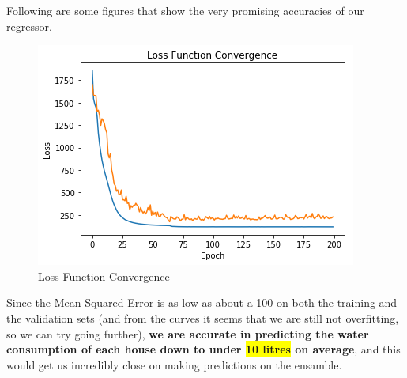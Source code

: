 \documentclass{article}
\begin{document}
Following are some figures that show the very promising accuracies of our regressor. 

\begin{figure}[H]
    \centering
    \includegraphics[width=\linewidth]{img-loss-fn-convergence.png}
    \caption{Loss Function Convergence}
    \label{fig:img-loss-fn-convergence}
\end{figure}

Since the Mean Squared Error is as low as about a 100 on both the training and the validation sets (and from the curves it seems that we are still not overfitting, so we can try going further), \textbf{we are accurate in predicting the water consumption of each house down to under \colorbox{yellow}{10 litres} on average}, and this would get us incredibly close on making predictions on the ensamble.
\end{document}
